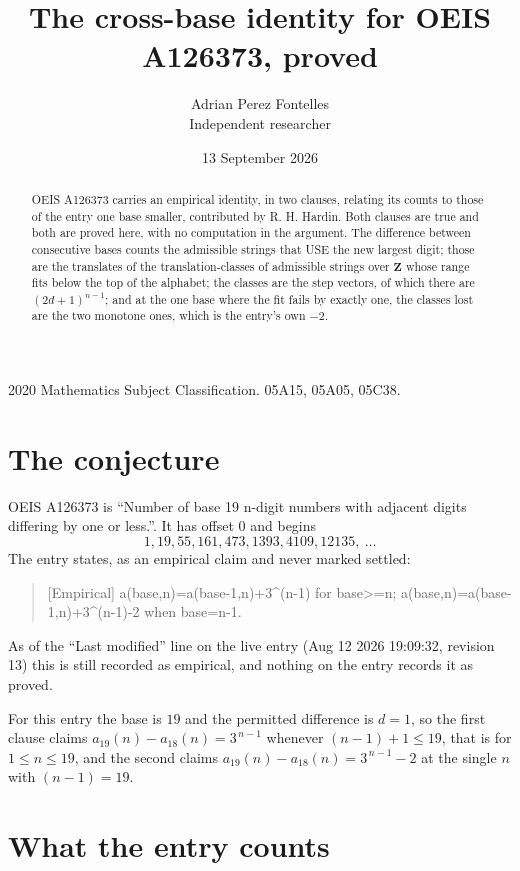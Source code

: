 \documentclass[11pt,a4paper]{article}
\title{The cross-base identity for OEIS A126373, proved}
\author{Adrian Perez Fontelles\\ \small Independent researcher}
\date{13 September 2026}
\theoremstyle{plain}
\theoremstyle{definition}
\begin{document}
\maketitle

\begin{abstract}
OEIS A126373 carries an empirical identity, in two clauses, relating its counts to those of the
entry one base smaller, contributed by R. H. Hardin. Both clauses are true and both are proved
here, with no computation in the argument. The difference between consecutive bases counts the
admissible strings that USE the new largest digit; those are the translates of the
translation-classes of admissible strings over $\mathbf{Z}$ whose range fits below the top of
the alphabet; the classes are the step vectors, of which there are $(2d+1)^{n-1}$; and at the
one base where the fit fails by exactly one, the classes lost are the two monotone ones, which
is the entry's own $-2$.
\end{abstract}

\noindent\small 2020 Mathematics Subject Classification. 05A15, 05A05, 05C38.\normalsize

\section{The conjecture}

OEIS A126373 is ``Number of base 19 n-digit numbers with adjacent digits differing by one or less.''. It has offset $0$ and begins
\[
1, 19, 55, 161, 473, 1393, 4109, 12135,\ \dots
\]
The entry states, as an empirical claim and never marked settled:
\begin{quote}
[Empirical] a(base,n)=a(base-1,n)+3\textasciicircum{}(n-1) for base>=n; a(base,n)=a(base-1,n)+3\textasciicircum{}(n-1)-2 when base=n-1.
\end{quote}
As of the ``Last modified'' line on the live entry (Aug 12 2026 19:09:32, revision 13)
this is still recorded as empirical, and nothing on the entry records it as proved.

For this entry the base is $19$ and the permitted difference is $d=1$, so the first clause
claims $a_{19}(n)-a_{18}(n)=3^{\,n-1}$ whenever $(n-1)+1\le19$, that is for
$1\le n\le19$, and the second claims $a_{19}(n)-a_{18}(n)=3^{\,n-1}-2$ at the single
$n$ with $(n-1)=19$.

\section{What the entry counts}
\end{document}
